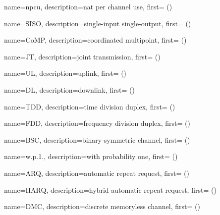 {
  name={npcu},
  description={nat per channel use},
  first={ ()}
}


{
  name={SISO},
  description={single-input single-output},
  first={ ()}
}

{
  name={CoMP},
  description={coordinated multipoint},
  first={ ()}
}

{
  name={JT},
  description={joint transmission},
  first={ ()}
}

{
  name={UL},
  description={uplink},
  first={ ()}
}


{
  name={DL},
  description={downlink},
  first={ ()}
}


{
  name={TDD},
  description={time division duplex},
  first={ ()}
}

{
  name={FDD},
  description={frequency division duplex},
  first={ ()}
}

















{
  name={BSC},
  description={binary-symmetric channel},
  first={ ()}
}

{
  name={w.p.1.},
  description={with probability one},
  first={ ()}
}

{
  name={ARQ},
  description={automatic repeat request},
  first={ ()}
}

{
  name={HARQ},
  description={hybrid automatic repeat request},
  first={ ()}
}





{
  name={DMC},
  description={discrete memoryless channel},
  first={ ()}
}

